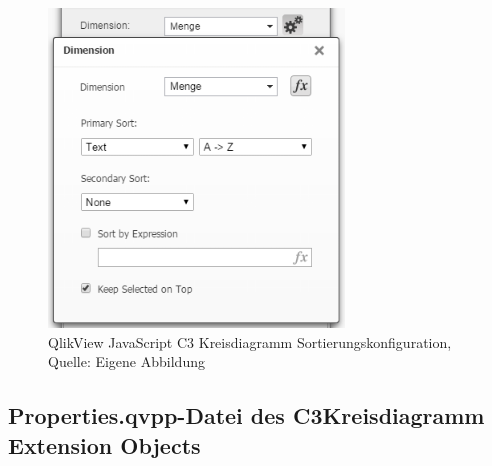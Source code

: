 \begin{appendix}
\ifIncludeFigures\begin{figure}[htbp]
	\centering
		\includegraphics[width=0.70\textwidth]{img/QvPropDialog/DimensionSortierung.png}
	\caption[QlikView JavaScript C3 Kreisdiagramm Sortierungskonfiguration]{QlikView JavaScript C3 Kreisdiagramm Sortierungskonfiguration, \\Quelle: Eigene Abbildung}
	\label{fig:DimensionSortierung}
\end{figure}\fi

\newpage
\subsection{Properties.qvpp-Datei des C3Kreisdiagramm Extension Objects} 
\label{lab:QlikViewJavascriptC3KreisdiagrammKonfigurationsdialog} 


\end{appendix}
